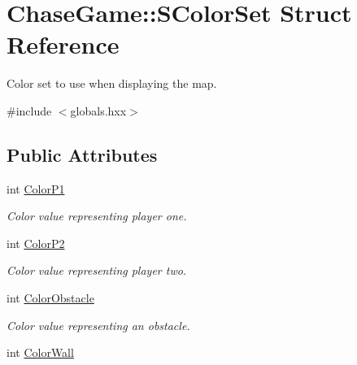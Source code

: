 \hypertarget{struct_chase_game_1_1_s_color_set}{\section{Chase\-Game\-:\-:S\-Color\-Set Struct Reference}
\label{struct_chase_game_1_1_s_color_set}
}


Color set to use when displaying the map.  




{\ttfamily \#include $<$globals.\-hxx$>$}

\subsection*{Public Attributes}
\begin{DoxyCompactItemize}
\item 
\hypertarget{struct_chase_game_1_1_s_color_set_a51e5a557359624fe92be93cb80621922}{int \hyperlink{struct_chase_game_1_1_s_color_set_a51e5a557359624fe92be93cb80621922}{Color\-P1}}\label{struct_chase_game_1_1_s_color_set_a51e5a557359624fe92be93cb80621922}

\begin{DoxyCompactList}\small\item\em Color value representing player one. \end{DoxyCompactList}\item 
\hypertarget{struct_chase_game_1_1_s_color_set_a777bce7519236b269ba44d921f54e4e8}{int \hyperlink{struct_chase_game_1_1_s_color_set_a777bce7519236b269ba44d921f54e4e8}{Color\-P2}}\label{struct_chase_game_1_1_s_color_set_a777bce7519236b269ba44d921f54e4e8}

\begin{DoxyCompactList}\small\item\em Color value representing player two. \end{DoxyCompactList}\item 
\hypertarget{struct_chase_game_1_1_s_color_set_acb1e4df5c042ae8ca8a66d7de26a9148}{int \hyperlink{struct_chase_game_1_1_s_color_set_acb1e4df5c042ae8ca8a66d7de26a9148}{Color\-Obstacle}}\label{struct_chase_game_1_1_s_color_set_acb1e4df5c042ae8ca8a66d7de26a9148}

\begin{DoxyCompactList}\small\item\em Color value representing an obstacle. \end{DoxyCompactList}\item 
\hypertarget{struct_chase_game_1_1_s_color_set_a7a7a8dae118390ce5b4432aa4d99a474}{int \hyperlink{struct_chase_game_1_1_s_color_set_a7a7a8dae118390ce5b4432aa4d99a474}{Color\-Wall}}\label{struct_chase_game_1_1_s_color_set_a7a7a8dae118390ce5b4432aa4d99a474}


\end{DoxyCompactItemize}
